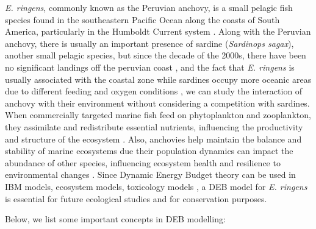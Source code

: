 \textit{E. ringens}, commonly known as the Peruvian anchovy, is a small pelagic fish species found in the southeastern Pacific Ocean along the coasts of South America, particularly in the Humboldt Current system \citep{GutiSwar2007}. Along with the Peruvian anchovy, there is usually an important presence of sardine (\textit{Sardinops sagax}), another small pelagic species, but since the decade of the 2000s, there have been no significant landings off the peruvian coast \citep{CardFran2015}, and the fact that \textit{E. ringens} is usually associated with the coastal zone while sardines occupy more oceanic areas due to different feeding and oxygen conditions \citep{EspiBert2008,BertChai2011}, we can study the interaction of anchovy with their environment without considering a competition with sardines.\\

When commercially targeted marine fish feed on phytoplankton and zooplankton, they assimilate and redistribute essential nutrients, influencing the productivity and structure of the ecosystem \citep{LeMeGuie2022}. Also, anchovies help maintain the balance and stability of marine ecosystems due their population dynamics can impact the abundance of other species, influencing ecosystem health and resilience to environmental changes \citep{FennSear2023}. Since Dynamic Energy Budget theory can be used in IBM models, ecosystem models, toxicology models \citep{LavaFilg2021}, a DEB model for \textit{E. ringens} is essential for future ecological studies and for conservation purposes.

Below, we list some important concepts in DEB modelling:

